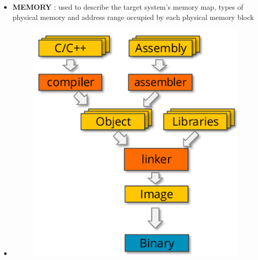 \begin{itemize}
    \item \textbf{MEMORY} : used to describe the target system's memory map, types of physical memory and address range occupied by each physical memory block
    \item[] \begin{minipage}{\linewidth}
      \centering
      \begin{minipage}{0.40\linewidth}
          \begin{figure}[H]
                \centering
                \includegraphics[width=1\linewidth]{img/image35.png}
          \end{figure}
      \end{minipage}
      \hspace{0.05\linewidth}
      \begin{minipage}{0.35\linewidth}
          \begin{figure}[H]
                \centering

\end{figure}
\end{minipage}
\end{minipage}
\end{itemize}
